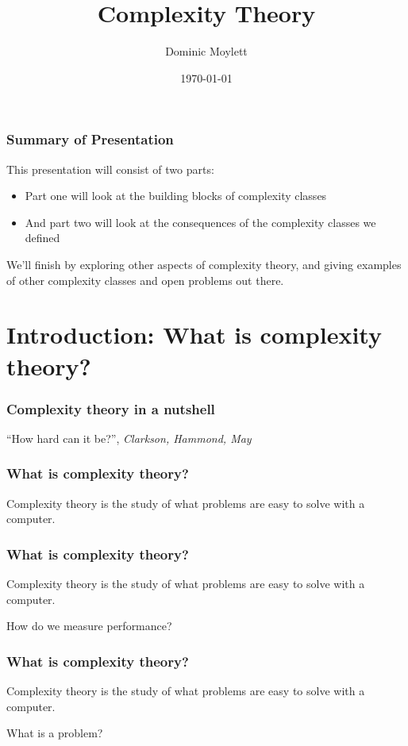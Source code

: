 \documentclass[aspectratio=169]{beamer}
\title[Complexity theory]{Complexity Theory} %
\author{Dominic Moylett} %
\institute[University of Bristol] %
{
Quantum Engineering CDT\\
University of Bristol \\ %
\medskip
\textit{\href{mailto:dominic.moylett@bristol.ac.uk}{dominic.moylett@bristol.ac.uk}} %
}
\date{\today} %
\begin{document}
\begin{frame}
\titlepage %
\end{frame}


\begin{frame}
\frametitle{Summary of Presentation}
This presentation will consist of two parts:
\begin{itemize}
	\item Part one will look at the building blocks of complexity classes
	\item And part two will look at the consequences of the complexity classes we defined
\end{itemize}

We'll finish by exploring other aspects of complexity theory, and giving examples of other complexity classes and open problems out there.
\end{frame}

\section{Introduction: What is complexity theory?}

\begin{frame}
\frametitle{Complexity theory in a nutshell}
\centerline{``How hard can it be?'', {\em Clarkson, Hammond, May}}
\end{frame}

\begin{frame}
\frametitle{What is complexity theory?}
Complexity theory is the study of what problems are easy to solve with a computer.
\end{frame}

\begin{frame}
\frametitle{What is complexity theory?}
Complexity theory is the study of what problems are {\color{red} easy} to solve with a computer.

How do we measure performance?
\end{frame}

\begin{frame}
\frametitle{What is complexity theory?}
Complexity theory is the study of what {\color{red} problems} are easy to solve with a computer.

What is a problem?
\end{frame}
\end{document}
